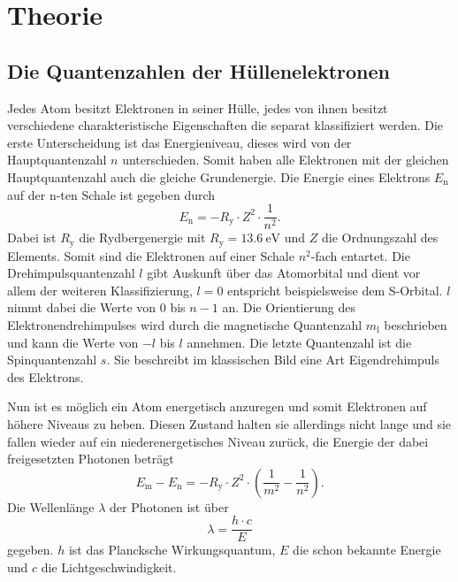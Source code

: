 \section{Theorie}
\label{sec:Theorie}

\subsection{Die Quantenzahlen der Hüllenelektronen}
\label{ssec:theo1}

Jedes Atom besitzt Elektronen in seiner Hülle, jedes von ihnen besitzt verschiedene charakteristische Eigenschaften die separat klassifiziert werden. 
Die erste Unterscheidung ist das Energieniveau, dieses wird von der Hauptquantenzahl $n$ unterschieden.
Somit haben alle Elektronen mit der gleichen Hauptquantenzahl auch die gleiche Grundenergie.
Die Energie eines Elektrons $E_\text{n}$ auf der n-ten Schale ist gegeben durch
\begin{equation}
    E_\text{n} = - R_\text{y} \cdot Z^2 \cdot \frac{1}{n^2}.
    \label{eq:n}
\end{equation}
Dabei ist $R_\text{y}$ die Rydbergenergie mit $ R_\text{y} = \SI{13.6}{\electronvolt}$ und $Z$ die Ordnungszahl des Elements.
Somit sind die Elektronen auf einer Schale $n^2$-fach entartet.
Die Drehimpulsquantenzahl $l$ gibt Auskunft über das Atomorbital und dient vor allem der weiteren Klassifizierung, $l = 0$ entspricht beispielsweise dem S-Orbital.
$l$ nimmt dabei die Werte von $0$ bis $ n - 1 $ an. 
Die Orientierung des Elektronendrehimpulses wird durch die magnetische Quantenzahl $m_\text{l}$ beschrieben und kann die Werte von $- l $ bis $ l $ annehmen.
Die letzte Quantenzahl ist die Spinquantenzahl $s$. 
Sie beschreibt im klassischen Bild eine Art Eigendrehimpuls des Elektrons.

Nun ist es möglich ein Atom energetisch anzuregen und somit Elektronen auf höhere Niveaus zu heben.
Diesen Zustand halten sie allerdings nicht lange und sie fallen wieder auf ein niederenergetisches Niveau zurück, die Energie der dabei freigesetzten Photonen beträgt 
\begin{equation}
    E_\text{m} - E_\text{n} = - R_\text{y} \cdot Z^2 \cdot \left( \frac{1}{m^2} - \frac{1}{n^2} \right).
    \label{eq:energiediff}
\end{equation}
Die Wellenlänge $\lambda$ der Photonen ist über
\begin{equation}
     \lambda = \frac{h \cdot c}{E}
    \label{eq:wellenl}
\end{equation}
gegeben. $h$ ist das Plancksche Wirkungsquantum, $E$ die schon bekannte Energie und $c$ die Lichtgeschwindigkeit.


